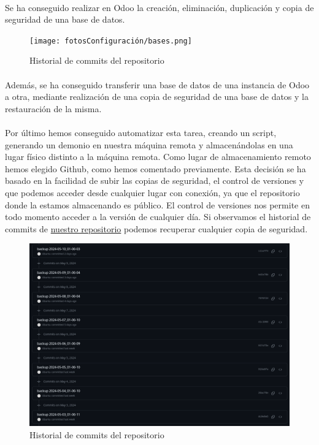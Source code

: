 \paragraph{}
Se ha conseguido realizar en Odoo la creación, eliminación, duplicación y copia de seguridad de una base de datos. 
\begin{figure}[h]
    \centering
    \texttt{[image: fotosConfiguración/bases.png]}
    \caption{Historial de commits del repositorio}
\end{figure}
\paragraph{} Además, se ha conseguido transferir una base de datos de una instancia de Odoo a otra, mediante realización de una copia de seguridad de una base de datos y la restauración de la misma. 
\paragraph{}
Por último hemos conseguido automatizar esta tarea, creando un script, generando un demonio en nuestra máquina remota y almacenándolas en una lugar físico distinto a la máquina remota. Como lugar de almacenamiento remoto hemos elegido Github, como hemos comentado previamente. Esta decisión se ha basado en la facilidad de subir las copias de seguridad, el control de versiones y que podemos acceder desde cualquier lugar con conexión, ya que el repositorio donde la estamos almacenando es público. El control de versiones nos permite en todo momento acceder a la versión de cualquier día. Si observamos el historial de commits de \href{https://github.com/Practicass/sisInfo2_proyect/commits/main/}{nuestro repositorio} podemos recuperar cualquier copia de seguridad. 
\begin{figure}[h]
    \centering
    \includegraphics[width=1\linewidth]{backup/commits.png}
    \caption{Historial de commits del repositorio}
\end{figure}
